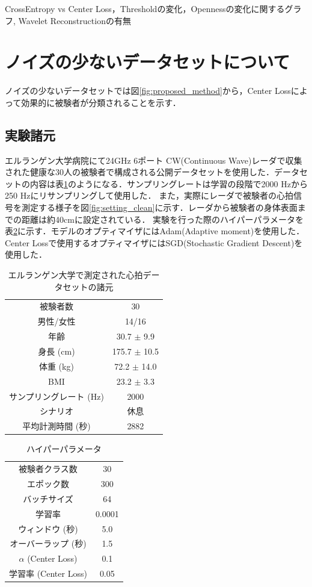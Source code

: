 CrossEntropy vs Center Loss，Thresholdの変化，Opennessの変化に関するグラフ, Wavelet Reconstructionの有無
\section{ノイズの少ないデータセットについて}
ノイズの少ないデータセットでは図\ref{fig:proposed_method}から，Center Lossによって効果的に被験者が分類されることを示す．
\subsection{実験諸元}
エルランゲン大学病院にて24GHz 6ポート CW(Continuous Wave)レーダで収集された健康な30人の被験者で構成される公開データセットを使用した\cite{paper:30-dataset}．データセットの内容は表\ref{table:30-dataset}のようになる．サンプリングレートは学習の段階で2000 Hzから250 Hzにリサンプリングして使用した．
また，実際にレーダで被験者の心拍信号を測定する様子を図\ref{fig:setting_clean}に示す．レーダから被験者の身体表面までの距離は約40cmに設定されている．
実験を行った際のハイパーパラメータを表\ref{table:30-parameter}に示す．モデルのオプティマイザにはAdam(Adaptive moment)を使用した．Center Lossで使用するオプティマイザにはSGD(Stochastic Gradient Descent)を使用した．

\begin{table}[H]
\caption{エルランゲン大学で測定された心拍データセットの諸元}
\centering
\begin{tabular}{cc}
\hline
被験者数 & 30 \\
男性/女性 & 14/16 \\
年齢 & 30.7 $\pm$ 9.9 \\
身長 (cm) & 175.7 $\pm$ 10.5 \\
体重 (kg) & 72.2 $\pm$ 14.0 \\
BMI & 23.2 $\pm$ 3.3 \\
サンプリングレート (Hz) & 2000 \\
シナリオ & 休息 \\
平均計測時間 (秒) & 2882 \\
\hline
\end{tabular}
\label{table:30-dataset}
\end{table}

\begin{table}[H]
\caption{ハイパーパラメータ}
\centering
\begin{tabular}{cc}
\hline
被験者クラス数 & 30 \\
エポック数 & 300 \\
バッチサイズ & 64 \\
学習率 & 0.0001 \\
ウィンドウ (秒) & 5.0 \\
オーバーラップ (秒) & 1.5 \\
$\alpha$ (Center Loss) & 0.1 \\
学習率 (Center Loss) & 0.05 \\
\hline
\end{tabular}
\label{table:30-parameter}
\end{table}


